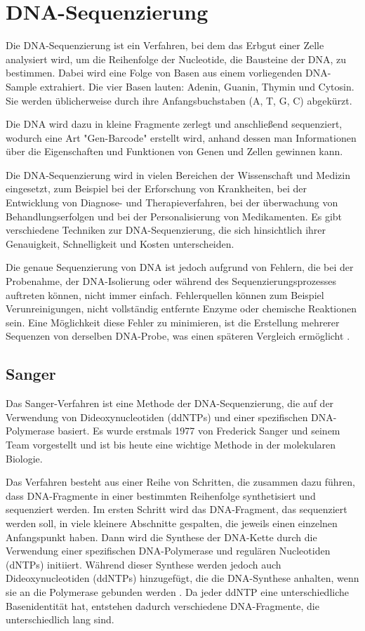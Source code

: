 \documentclass[oneside,bibliography=totocnumbered,BCOR=5mm]{scrbook}%
\theoremstyle{definition}
\theoremstyle{definition}
\theoremstyle{definition}
\theoremstyle{definition}
\theoremstyle{definition}
\theoremstyle{definition}
\begin{document}
\section{DNA-Sequenzierung}


Die DNA-Sequenzierung ist ein Verfahren, bei dem das Erbgut einer Zelle analysiert wird, 
um die Reihenfolge der Nucleotide, die Bausteine der DNA, zu bestimmen. 
Dabei wird eine Folge von Basen aus einem vorliegenden DNA-Sample extrahiert.
Die vier Basen lauten: Adenin, Guanin, Thymin und Cytosin. 
Sie werden üblicherweise durch ihre Anfangsbuchstaben (A, T, G, C) abgekürzt.


Die DNA wird dazu in kleine Fragmente zerlegt und anschließend sequenziert, 
wodurch eine Art "Gen-Barcode" erstellt wird, anhand dessen man Informationen über die 
Eigenschaften und Funktionen von Genen und Zellen gewinnen kann.


Die DNA-Sequenzierung wird in vielen Bereichen der Wissenschaft und Medizin eingesetzt, 
zum Beispiel bei der Erforschung von Krankheiten, bei der Entwicklung von Diagnose- und Therapieverfahren, 
bei der überwachung von Behandlungserfolgen und bei der Personalisierung von Medikamenten. 
Es gibt verschiedene Techniken zur DNA-Sequenzierung, die sich hinsichtlich ihrer Genauigkeit, 
Schnelligkeit und Kosten unterscheiden.


Die genaue Sequenzierung von DNA ist jedoch aufgrund von Fehlern, die bei der Probenahme, 
der DNA-Isolierung oder während des Sequenzierungsprozesses auftreten können, 
nicht immer einfach. 
Fehlerquellen können zum Beispiel Verunreinigungen, nicht vollständig entfernte Enzyme oder chemische Reaktionen sein. 
Eine Möglichkeit diese Fehler zu minimieren, ist die Erstellung mehrerer Sequenzen von derselben DNA-Probe, 
was einen späteren Vergleich ermöglicht \autocite{dnaReplicants}.


\subsection{Sanger}

Das Sanger-Verfahren ist eine Methode der DNA-Sequenzierung, 
die auf der Verwendung von Dideoxynucleotiden (ddNTPs) und einer spezifischen DNA-Polymerase basiert. 
Es wurde erstmals 1977 von Frederick Sanger und seinem Team vorgestellt und ist bis heute eine wichtige Methode 
in der molekularen Biologie.


Das Verfahren besteht aus einer Reihe von Schritten, die zusammen dazu führen, 
dass DNA-Fragmente in einer bestimmten Reihenfolge synthetisiert und sequenziert werden. 
Im ersten Schritt wird das DNA-Fragment, das sequenziert werden soll, in viele kleinere Abschnitte gespalten, 
die jeweils einen einzelnen Anfangspunkt haben. Dann wird die Synthese der DNA-Kette durch die Verwendung 
einer spezifischen DNA-Polymerase und regulären Nucleotiden (dNTPs) initiiert. 
Während dieser Synthese werden jedoch auch Dideoxynucleotiden (ddNTPs) hinzugefügt, die die DNA-Synthese anhalten, 
wenn sie an die Polymerase gebunden werden \autocite[Seite 2]{metzker2005}. 
Da jeder ddNTP eine unterschiedliche Basenidentität hat, entstehen dadurch verschiedene DNA-Fragmente, 
die unterschiedlich lang sind.
\end{document}
